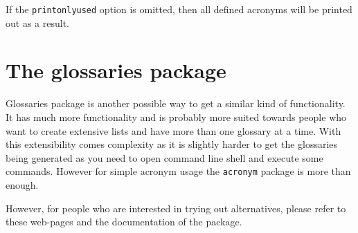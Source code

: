 If the \verb|printonlyused| option is omitted, then all defined acronyms will be
printed out as a result.

\section{The glossaries package}

Glossaries package is another possible way to get a similar kind of
functionality. It has much more functionality and is probably more suited
towards people who want to create extensive lists and have more than one
glossary at a time. With this extensibility comes complexity as it is slightly
harder to get the glossaries being generated as you need to open command line
shell and execute some commands. However for simple acronym usage the
\verb|acronym| package is more than enough.

However, for people who are interested in trying out alternatives, please refer
to these web-pages and the documentation of the package.



